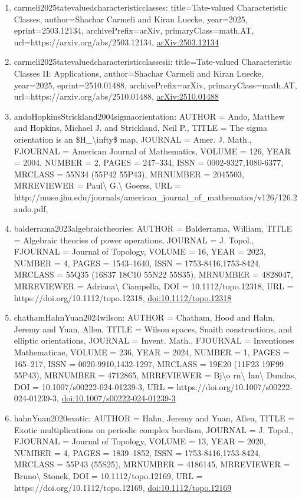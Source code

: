 \documentclass[11pt]{article}
\begin{document}
\begin{enumerate}[leftmargin=*]
  \item carmeli2025tatevaluedcharacteristicclasses: title=Tate-valued Characteristic Classes, author=Shachar Carmeli and Kiran Luecke, year=2025, eprint=2503.12134, archivePrefix=arXiv, primaryClass=math.AT, url=https://arxiv.org/abs/2503.12134, \href{https://arxiv.org/abs/2503.12134}{arXiv:2503.12134}
  \item carmeli2025tatevaluedcharacteristicclassesii: title=Tate-valued Characteristic Classes II: Applications, author=Shachar Carmeli and Kiran Luecke, year=2025, eprint=2510.01488, archivePrefix=arXiv, primaryClass=math.AT, url=https://arxiv.org/abs/2510.01488, \href{https://arxiv.org/abs/2510.01488}{arXiv:2510.01488}
  \item andoHopkinsStrickland2004sigmaorientation: AUTHOR = Ando, Matthew and Hopkins, Michael J. and Strickland, Neil P., TITLE = The sigma orientation is an \$H\_\textbackslash{}infty\$ map, JOURNAL = Amer. J. Math., FJOURNAL = American Journal of Mathematics, VOLUME = 126, YEAR = 2004, NUMBER = 2, PAGES = 247--334, ISSN = 0002-9327,1080-6377, MRCLASS = 55N34 (55P42 55P43), MRNUMBER = 2045503, MRREVIEWER = Paul\textbackslash{} G.\textbackslash{} Goerss, URL = http://muse.jhu.edu/journals/american\_journal\_of\_mathematics/v126/126.2ando.pdf,
  \item balderrama2023algebraictheories: AUTHOR = Balderrama, William, TITLE = Algebraic theories of power operations, JOURNAL = J. Topol., FJOURNAL = Journal of Topology, VOLUME = 16, YEAR = 2023, NUMBER = 4, PAGES = 1543--1640, ISSN = 1753-8416,1753-8424, MRCLASS = 55Q35 (16S37 18C10 55N22 55S35), MRNUMBER = 4828047, MRREVIEWER = Adriana\textbackslash{} Ciampella, DOI = 10.1112/topo.12318, URL = https://doi.org/10.1112/topo.12318, \href{https://doi.org/10.1112/topo.12318}{doi:10.1112/topo.12318}
  \item chathamHahnYuan2024wilson: AUTHOR = Chatham, Hood and Hahn, Jeremy and Yuan, Allen, TITLE = Wilson spaces, Snaith constructions, and elliptic orientations, JOURNAL = Invent. Math., FJOURNAL = Inventiones Mathematicae, VOLUME = 236, YEAR = 2024, NUMBER = 1, PAGES = 165--217, ISSN = 0020-9910,1432-1297, MRCLASS = 19E20 (11F23 19F99 55P43), MRNUMBER = 4712865, MRREVIEWER = Bj\textbackslash{}o rn\textbackslash{} Ian\textbackslash{} Dundas, DOI = 10.1007/s00222-024-01239-3, URL = https://doi.org/10.1007/s00222-024-01239-3, \href{https://doi.org/10.1007/s00222-024-01239-3}{doi:10.1007/s00222-024-01239-3}
  \item hahnYuan2020exotic: AUTHOR = Hahn, Jeremy and Yuan, Allen, TITLE = Exotic multiplications on periodic complex bordism, JOURNAL = J. Topol., FJOURNAL = Journal of Topology, VOLUME = 13, YEAR = 2020, NUMBER = 4, PAGES = 1839--1852, ISSN = 1753-8416,1753-8424, MRCLASS = 55P43 (55S25), MRNUMBER = 4186145, MRREVIEWER = Bruno\textbackslash{} Stonek, DOI = 10.1112/topo.12169, URL = https://doi.org/10.1112/topo.12169, \href{https://doi.org/10.1112/topo.12169}{doi:10.1112/topo.12169}

\end{enumerate}
\end{document}
